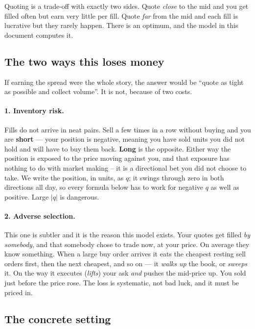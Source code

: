 \documentclass[11pt,a4paper]{article}
\begin{document}
\begin{intuition}
Quoting is a trade-off with exactly two sides. Quote \emph{close} to the mid and
you get filled often but earn very little per fill. Quote \emph{far} from the mid
and each fill is lucrative but they rarely happen. There is an optimum, and the
model in this document computes it.
\end{intuition}

\subsection{The two ways this loses money}

If earning the spread were the whole story, the answer would be ``quote as tight
as possible and collect volume''. It is not, because of two costs.

\paragraph{1. Inventory risk.} Fills do not arrive in neat pairs. Sell a few times
in a row without buying and you are \textbf{short} --- your position is negative,
meaning you have sold units you did not hold and will have to buy them back.
\textbf{Long} is the opposite. Either way the position is exposed to the price
moving against you, and that exposure has nothing to do with market making --
it is a directional bet you did not choose to take. We write the position, in
units, as $q$; it swings through zero in both directions all day, so every
formula below has to work for negative $q$ as well as positive. Large $|q|$ is
dangerous.

\paragraph{2. Adverse selection.} This one is subtler and it is the reason this
model exists. Your quotes get filled \emph{by somebody}, and that
somebody chose to trade now, at your price. On average they know something.
When a large buy order arrives it eats the cheapest resting sell orders first,
then the next cheapest, and so on --- it \emph{walks up} the book, or
\emph{sweeps} it. On the way it executes (\emph{lifts}) your ask \emph{and}
pushes the mid-price up. You sold just before the price rose. The loss is systematic, not
bad luck, and it must be priced in.

\subsection{The concrete setting}
\end{document}

